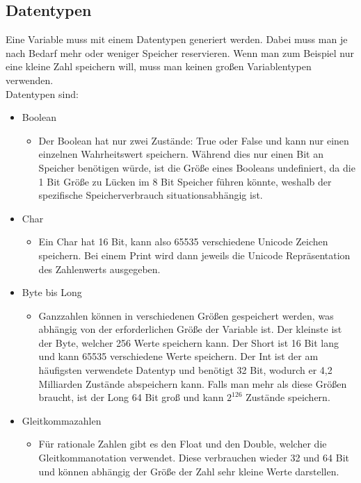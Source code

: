 \documentclass{article}
\begin{document}
	\subsection{Datentypen}
	Eine Variable muss mit einem Datentypen generiert werden. Dabei muss man je nach Bedarf mehr oder weniger Speicher reservieren. Wenn man zum Beispiel nur eine kleine Zahl speichern will, muss man keinen großen Variablentypen verwenden. \\
	Datentypen sind: \\
	\begin{itemize}
		\item{Boolean}
		\begin{itemize}
			\item{Der Boolean hat nur zwei Zustände: True oder False und kann nur einen einzelnen Wahrheitswert speichern. Während dies nur einen Bit an Speicher benötigen würde, ist die Größe eines Booleans undefiniert, da die 1 Bit Größe zu Lücken im 8 Bit Speicher führen könnte, weshalb der spezifische Speicherverbrauch situationsabhängig ist.}
		\end{itemize}
		\item{Char}
		\begin{itemize}
			\item{Ein Char hat 16 Bit, kann also 65535 verschiedene Unicode Zeichen speichern. Bei einem Print wird dann jeweils die Unicode Repräsentation des Zahlenwerts ausgegeben.}
		\end{itemize}
		\item{Byte bis Long}
		\begin{itemize}
			\item{Ganzzahlen können in verschiedenen Größen gespeichert werden, was abhängig von der erforderlichen Größe der Variable ist. Der kleinste ist der Byte, welcher 256 Werte speichern kann. Der Short ist 16 Bit lang und kann 65535 verschiedene Werte speichern. Der Int ist der am häufigsten verwendete Datentyp und benötigt 32 Bit, wodurch er 4,2 Milliarden Zustände abspeichern kann. Falls man mehr als diese Größen braucht, ist der Long 64 Bit groß und kann $2^126$ Zustände speichern.}
		\end{itemize}
		\item{Gleitkommazahlen}
		\begin{itemize}
			\item{Für rationale Zahlen gibt es den Float und den Double, welcher die Gleitkommanotation verwendet. Diese verbrauchen wieder 32 und 64 Bit und können abhängig der Größe der Zahl sehr kleine Werte darstellen.}
		\end{itemize}
	\end{itemize}
\end{document}
